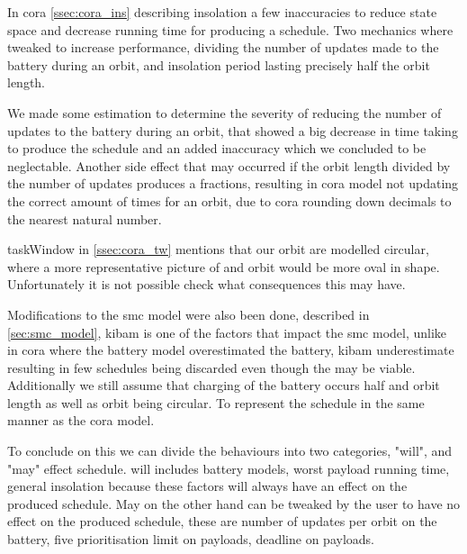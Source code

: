 In \gls{cora} \cref{ssec:cora_ins} describing insolation a few inaccuracies to reduce state space and decrease running time for producing a schedule. Two mechanics where tweaked to increase performance, dividing the number of updates made to the battery during an orbit, and insolation period lasting precisely half the orbit length.

We made some estimation to determine the severity of reducing the number of updates to the battery during an orbit, that showed a big decrease in time taking to produce the schedule and an added inaccuracy which we concluded to be neglectable. Another side effect that may occurred  if the orbit length divided by the number of updates produces a fractions, resulting in \gls{cora} model not updating the correct amount of times for an orbit, due to \gls{cora}  rounding down decimals to the nearest natural number.

taskWindow in \cref{ssec:cora_tw} mentions that our orbit are modelled circular, where a more representative picture of and orbit would be more oval in shape. Unfortunately it is not possible check what consequences this may have.

Modifications to the \gls{smc} model were also been done, described in \cref{sec:smc_model}, \gls{kibam} is one of the factors that impact the \gls{smc} model, unlike in \gls{cora} where the battery model overestimated the battery, \gls{kibam} underestimate resulting in few schedules being discarded even though the may be viable. Additionally we still assume that charging of the battery occurs half and orbit length as well as orbit being circular. To represent the schedule in the same manner as the \gls{cora} model.

To conclude on this we can divide the behaviours into two categories, "will", and "may" effect schedule. will includes battery models, worst payload running time, general insolation because these factors will always have an effect on the produced schedule. May on the other hand can be tweaked by the user to have no effect on the produced schedule, these are number of updates per orbit on the battery, five prioritisation limit on payloads, deadline on payloads.







